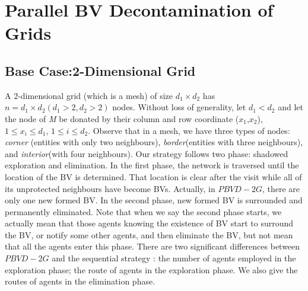 \section{Parallel BV Decontamination of Grids}
\subsection{Base Case:2-Dimensional Grid}
A 2-dimensional grid (which is a mesh) of size $d_1\times d_2$ has $n=d_1\times d_2(d_1>2,d_2>2)$ nodes. Without loss of generality, let $d_1<d_2$ and let the node of {\em M} be donated by their column and row coordinate ($x_1$,$x_2$), $1\leq x_i \leq d_1$, $1\leq i \leq d_2$. Observe that in a mesh, we have three types of nodes: \textit{corner} (entities with only two neighbours), \textit{border}(entities with three neighbours), and \textit{interior}(with four neighbours).  Our strategy follows two phase: shadowed exploration and elimination. In the first phase, the network is traversed until the location of the BV is determined. That location is clear after the visit while all of its unprotected neighbours have become BVs. Actually, in $PBVD-2G$, there are only one new formed BV. In the second phase, new formed BV is surrounded and permanently eliminated. Note that when we say the second phase starts, we actually mean that those agents knowing the existence of BV start to surround the BV, or notify some other agents, and then eliminate the BV, but not mean that all the agents enter this phase. There are two significant differences between $PBVD-2G$ and the sequential strategy : the number of agents employed in the exploration phase; the route of agents in the exploration phase. We also give the routes of agents in the elimination phase. 

